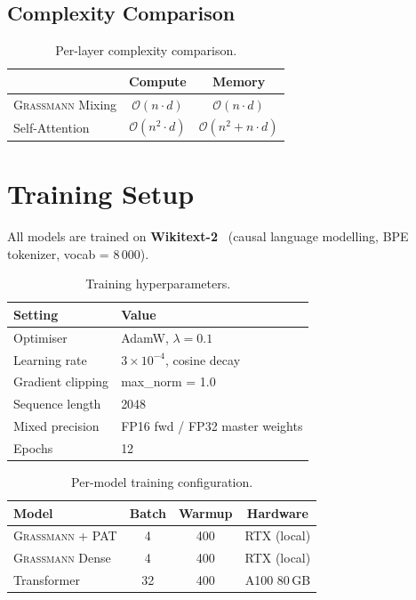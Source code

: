 \documentclass[conference]{IEEEtran}
\newcommand{\grassmann}{\textsc{Grassmann}}
\newcommand{\pat}{\textsc{PAT}}
\newcommand{\bigO}[1]{\ensuremath{\mathcal{O}(#1)}}
\begin{document}
\subsection{Complexity Comparison}
\begin{table}[htbp]
\centering
\caption{Per-layer complexity comparison.}
\label{tab:complexity}
\small
\begin{tabular}{@{}lcc@{}}
\toprule
& \textbf{Compute} & \textbf{Memory} \\
\midrule
\grassmann{} Mixing & $\bigO{n \cdot d}$      & $\bigO{n \cdot d}$ \\
Self-Attention      & $\bigO{n^2 \cdot d}$    & $\bigO{n^2 + n \cdot d}$ \\
\bottomrule
\end{tabular}
\end{table}


\section{Training Setup}
\label{sec:training}

All models are trained on \textbf{Wikitext-2}~\cite{merity2017pointer}
(causal language modelling, BPE tokenizer, vocab = 8\,000).

\begin{table}[htbp]
\centering
\caption{Training hyperparameters.}
\label{tab:hparams}
\small
\begin{tabular}{@{}ll@{}}
\toprule
\textbf{Setting} & \textbf{Value} \\
\midrule
Optimiser          & AdamW, $\lambda = 0.1$ \\
Learning rate      & $3 \times 10^{-4}$, cosine decay \\
Gradient clipping  & max\_norm = 1.0 \\
Sequence length    & 2048 \\
Mixed precision    & FP16 fwd / FP32 master weights \\
Epochs             & 12 \\
\bottomrule
\end{tabular}
\end{table}

\begin{table}[htbp]
\centering
\caption{Per-model training configuration.}
\label{tab:train-per-model}
\small
\begin{tabular}{@{}lccc@{}}
\toprule
\textbf{Model} & \textbf{Batch} & \textbf{Warmup} & \textbf{Hardware} \\
\midrule
\grassmann{} + \pat{} & 4  & 400 & RTX (local) \\
\grassmann{} Dense    & 4  & 400 & RTX (local) \\
Transformer           & 32 & 400 & A100 80\,GB \\
\bottomrule
\end{tabular}
\end{table}
\end{document}
